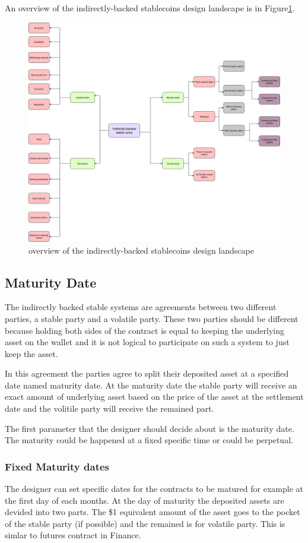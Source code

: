 \documentclass[runningheads]{llncs}
\begin{document}
An overview of the indirectly-backed stablecoins design landscape is in Figure\ref{land}.

\begin{figure} 
\centering
\includegraphics[width=12cm]{Mindmap}
\caption{overview of the indirectly-backed stablecoins design landscape}
\label{land}
\end{figure}

\subsection{Maturity Date}
The indirectly backed stable systems are agreements between two different parties, a stable party and a volatile party. These two parties should be different because holding both sides of the contract is equal to keeping the underlying asset on the wallet and it is not logical to participate on such a system to just keep the asset.

In this agreement the parties agree to split their deposited asset at a specified date named maturity date. At the maturity date the stable party will receive an exact amount of underlying asset based on the price of the asset at the settlement date and the volitile party will receive the remained part.

The first parameter that the designer should decide about is the maturity date. The maturity could be happened at a fixed specific time or could be perpetual.
\subsubsection{Fixed Maturity dates}
The designer can set specific dates for the contracts to be matured for example at the first day of each months. At the day of maturity the deposited assets are devided into two parts. The \$1 equivalent amount of the asset goes to the pocket of the stable party (if possible) and the remained is for volatile party. This is simlar to futures contract in Finance.
\end{document}
